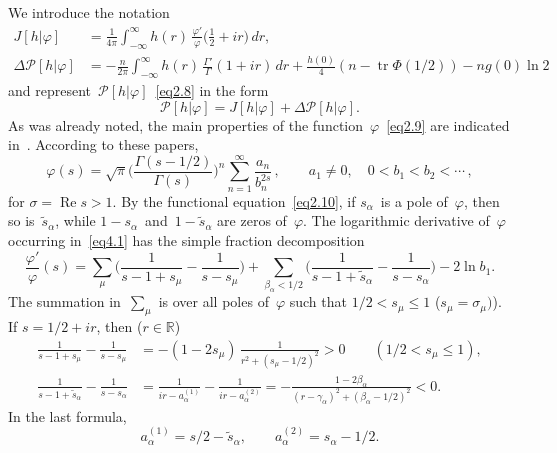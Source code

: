 \documentclass{amsart}
\theoremstyle{plain}
\theoremstyle{definition}
\numberwithin{equation}{section}
\begin{document}
We introduce the notation
\begin{align}
\label{eq4.1}
J[h|\varphi]&=\frac{1}{4\pi}\int_{-\infty}^\infty h(r)\,
\frac{\varphi'}\varphi\biggl(\frac{1}{2}+ir\biggr)\,dr,
\\
\label{eq4.2} \Delta
\mathscr{P}[h|\varphi]&=-\frac{n}{2\pi}\int_{-\infty}^\infty h(r)\,
\frac{\Gamma'}{\Gamma}(1+ir)\,dr+
\frac{h(0)}{4}(n-\operatorname{tr}\Phi(1/2))-ng(0)\ln 2
\end{align}
and represent~$\mathscr{P}[h|\varphi]$~\eqref{eq2.8} in the form
\begin{equation}
\label{eq4.3} \mathscr{P}[h|\varphi]=J[h|\varphi]+\Delta
\mathscr{P}[h|\varphi].
\end{equation}
As was already noted, the main properties of the
function~$\varphi$~\eqref{eq2.9} are indicated in~\cite{1,3,12}.
According to these papers,
\begin{equation}
\label{eq4.4}
\varphi(s)=\sqrt\pi\biggl(\frac{\Gamma(s-1/2)}{\Gamma(s)}\biggr)^n
\sum_{n=1}^\infty\frac{a_n}{b_n^{2s}}\,,\qquad
a_1\ne0,\quad
0<b_1<b_2<\cdots\,,
\end{equation}
for $\sigma=\operatorname{Re}s>1$. By the functional
equation~\eqref{eq2.10}, if $s_\alpha$~is a pole of~$\varphi$, then
so is~$\tilde s_\alpha$, while $1-s_\alpha$~and~$1-\tilde s_\alpha$
are zeros of~$\varphi$. The logarithmic derivative of~$\varphi$
occurring in~\eqref{eq4.1} has the simple fraction
decomposition~\cite{17}
\begin{equation}
\label{eq4.5}
\frac{\varphi'}\varphi(s)=\sum_{\mu}\biggl(\frac{1}{s-1+s_\mu}-
\frac{1}{s-s_\mu}\biggr)+\sum_{\beta_\alpha<1/2}
\biggl(\frac{1}{s-1+\tilde s_\alpha}-\frac{1}{s-s_\alpha}\biggr)-2\ln b_1.
\end{equation}
The summation in~$\sum_\mu$ is over all poles of~$\varphi$ such
that $1/2<s_\mu\leqslant1$ ($s_\mu=\sigma_{\mu})$). If $s=1/2+ir$,
then ($r\in\mathbb{R}$)
\begin{equation}
\label{eq4.6}
\begin{aligned}
\frac{1}{s-1+s_\mu}-\frac{1}{s-s_\mu}&=
-(1-2s_\mu)\,\frac{1}{r^2+(s_\mu-1/2)^2}>0\qquad
(1/2<s_\mu\leqslant1),
\\
\frac{1}{s-1+\tilde s_\alpha}-\frac{1}{s-s_\alpha}&=
\frac{1}{ir-a_\alpha^{(1)}}-\frac{1}{ir-a_\alpha^{(2)}}=
-\frac{1-2\beta_\alpha}{(r-\gamma_\alpha)^2+(\beta_\alpha-1/2)^2}<0.
\end{aligned}
\end{equation}
In the last formula,
\begin{equation}
\label{eq4.7}
a_\alpha^{(1)}=s/2-\tilde s_\alpha,\qquad
a_\alpha^{(2)}=s_\alpha-1/2.
\end{equation}
\end{document}
